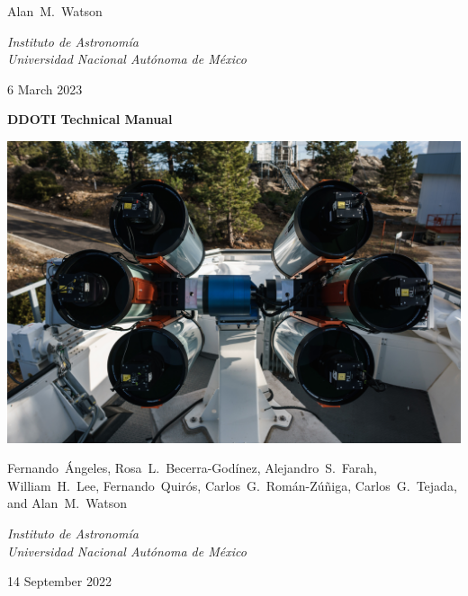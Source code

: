\begin{centering}
\bigskip
\bigskip
{
\baselineskip=10pt
 \large
 Alan~M.~Watson
 \par
}
\bigskip
{
 \large
 \itshape 
 Instituto de Astronomía\\
 Universidad Nacional Autónoma de México
 \par
}
\bigskip
{
 \large
 6 March 2023
}
\fi

\ifddoti
\bigskip
\bigskip

{
 \Large
 \bfseries 
 DDOTI Technical Manual
 \par
}
\bigskip
\bigskip
\includegraphics[width=\linewidth]{figures/frontmatter-ddoti.jpg}

\bigskip
\bigskip
{
\baselineskip=10pt
 \large
 Fernando~Ángeles,
 Rosa~L.~Becerra-Godínez,
 Alejandro~S.~Farah,
 William~H.~Lee,
 Fernando~Quirós,
 Carlos~G.~Román-Zúñiga,
 Carlos~G.~Tejada,
 and
 Alan~M.~Watson
 \par
}
\bigskip
{
 \large
 \itshape 
 Instituto de Astronomía\\
 Universidad Nacional Autónoma de México
 \par
}
\bigskip
{
 \large
 14 September 2022
}
\fi

\end{centering}

\newpage

\pagestyle{plain}


\tableofcontents

